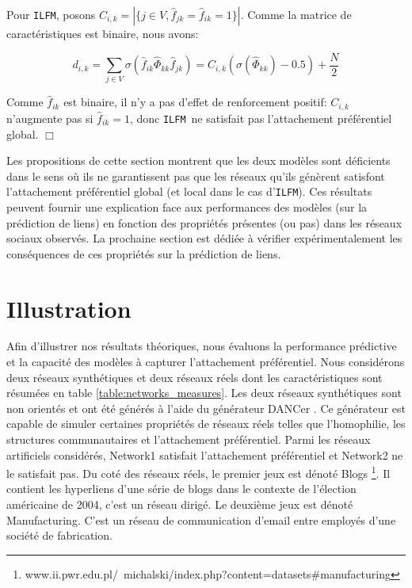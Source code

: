 \documentclass[french]{hermes-journal}
\newcommand{\ilfm}{\texttt{ILFM}}
\begin{document}
Pour \ilfm, posons $C_{i,k} = |\{j \in V, \hat{f}_{jk} = \hat{f}_{ik} = 1\}|$. Comme la matrice de caractéristiques est binaire, nous avons: 

\[ 
d_{i,k} = \sum_{j\in V} \sigma(\hat{f}_{ik} \hat{\Phi}_{kk} \hat{f}_{jk}) =  C_{i,k} (\sigma(\hat{\Phi}_{kk})-0.5) + \frac{N}{2}
\]

Comme $\hat{f}_{ik}$  est binaire, il n'y a pas d'effet de  renforcement positif: $C_{i,k}$ n'augmente pas si $\hat{f}_{ik}=1$, donc \ilfm\ ne satisfait  pas l'attachement préférentiel global. \hfill $\Box$

Les propositions de cette section montrent que les deux modèles sont déficients dans le sens où ils ne garantissent pas que les réseaux qu'ils génèrent satisfont l'attachement préférentiel global (et local dans le cas d'\ilfm). Ces résultats peuvent fournir une explication face aux performances des modèles (sur la prédiction de liens) en fonction des propriétés présentes (ou pas) dans les réseaux sociaux observés. 
La prochaine section est dédiée à vérifier expérimentalement les conséquences de ces propriétés sur la prédiction de liens.

\section{Illustration}
\label{sec:exps}

Afin d'illustrer nos résultats théoriques, nous évaluons la performance prédictive et la capacité des modèles à capturer l'attachement préférentiel. Nous considérons deux réseaux synthétiques et deux réseaux réels dont les caractéristiques sont résumées en table \ref{table:networks_measures}. Les deux réseaux synthétiques sont non orientés et ont été générés à l'aide du générateur DANCer \cite{largeron2015}. Ce générateur est capable de  simuler certaines propriétés de réseaux réels telles que l'homophilie, les structures communautaires et l'attachement préférentiel. Parmi les réseaux artificiels considérés, Network1 satisfait l'attachement préférentiel et Network2 ne le satisfait pas. Du coté des réseaux réels, le premier jeux est dénoté Blogs \footnote{www.ii.pwr.edu.pl/~michalski/index.php?content=datasets\#manufacturing}. Il contient les hyperliens d'une série de blogs dans le contexte de l'élection américaine de 2004, c'est un réseau dirigé. Le deuxième jeux est dénoté Manufacturing. C'est un réseau de communication d'email entre employés d'une société de fabrication. 


\end{document}
